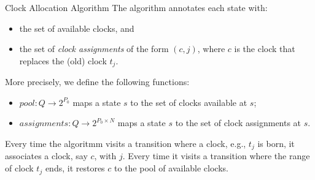 \documentclass[10pt]{beamer}
\theoremstyle{plain}
\theoremstyle{definition}
\newcommand*{\Var}[1]{\ensuremath{\mathit{#1}}}
\begin{document}
\begin{frame}{Clock Allocation Algorithm}
	The algorithm annotates each state with:
	\begin{itemize}
		\item
		the set of available clocks, and
		\item
		the set of \emph{clock assignments} of the form $(c, j)$, where $c$ is the clock that replaces the (old) clock $t_j$.
	\end{itemize}
	\noindent
	More precisely, we define the following functions:
	\begin{itemize}
		\item
		$\Var{pool}:Q\rightarrow 2^{P_0}$ maps a state $s$ to the set of clocks available at $s$;
		\item
		$\Var{assignments}:Q\rightarrow 2^{P_0 \times N}$ maps a state $s$ to the set of clock assignments at $s$.
	\end{itemize}


Every time the algoritmm visits a transition where a clock, e.g.,
$t_j$ is born, it associates a clock, say $c$, with $j$. Every time it visits a transition
where the range of clock $t_j$ ends, it restores $c$ to the pool of available
clocks. 
\end{frame}
\end{document}
